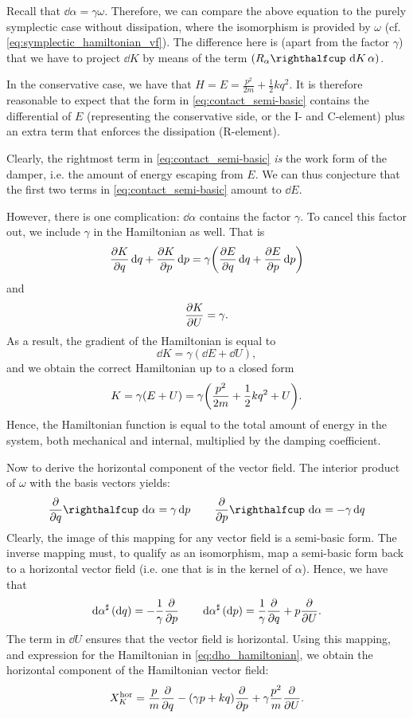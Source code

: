 Recall that $\dd{\alpha} = \gamma \omega $. Therefore, we can compare the above equation to the purely symplectic case without dissipation, where the isomorphism is provided by $\omega$ (cf. \cref{eq:symplectic_hamiltonian_vf}). The difference here is (apart from the factor $\gamma$) that we have to project $\dd{K}$ by means of the term $\qty(\intpr{R_\alpha}{\dd{K}}\alpha)$.

In the conservative case, we have that $H = E = \frac{p^2}{2m} + \frac{1}{2}kq^2$. It is therefore reasonable to expect that the form in \cref{eq:contact_semi-basic} contains the differential of $E$ (representing the conservative side, or the I- and C-element) plus an extra term that enforces the dissipation (R-element). 

Clearly, the rightmost term in \cref{eq:contact_semi-basic} \emph{is} the work form of the damper, i.e. the amount of energy escaping from $E$. We can thus conjecture that the first two terms in \cref{eq:contact_semi-basic} amount to $\dd{E}$.

However, there is one complication: $\dd{\alpha}$ contains the factor $\gamma$. To cancel this factor out, we include $\gamma$ in the Hamiltonian as well. That is
$$ 
    \pdv{K}{q}\dd{q} + \pdv{K}{p}\dd{p} = \gamma \qty(\pdv{E}{q}\dd{q} + \pdv{E}{p}\dd{p}) $$
and 
$$ \pdv{K}{U} = \gamma. $$
As a result, the gradient of the Hamiltonian is equal to 
$$ \dd{K} = \gamma (\dd{E} + \dd{U}), $$
and we obtain the correct Hamiltonian up to a closed form
\begin{equation} 
    K = \gamma (E + U) = \gamma\qty( \frac{p^2}{2m} + \frac{1}{2}kq^2 + U). 
    \label{eq:dho_hamiltonian}
\end{equation} 
Hence, the Hamiltonian function is equal to the total amount of energy in the system, both mechanical and internal, multiplied by the damping coefficient.

Now to derive the horizontal component of the vector field. The interior product of $\omega$ with the basis vectors yields:
\begin{equation}
    \intpr{\pdv{}{q}}{\dd{\alpha}} = \gamma \dd{p} \qquad \intpr{\pdv{}{p}}{\dd{\alpha}} = -\gamma \dd{q}
\end{equation}
Clearly, the image of this mapping for any vector field is a semi-basic form. The inverse mapping must, to qualify as an isomorphism, map a semi-basic form back to a horizontal vector field (i.e. one that is in the kernel of $\alpha$). Hence, we have that
\begin{equation} 
    \dd{\alpha}^\sharp\qty(\dd{q}) = -\frac{1}{\gamma} \pdv{}{p} \qquad 
    \dd{\alpha}^\sharp\qty(\dd{p}) = \frac{1}{\gamma}\pdv{}{q} +  p \pdv{}{U}. 
\end{equation}
The term in $\dd{U}$ ensures that the vector field is horizontal. Using this mapping, and expression for the Hamiltonian in \cref{eq:dho_hamiltonian}, we obtain the horizontal component of the Hamiltonian vector field:
\begin{equation} 
    X_K^\text{hor} = \frac{p}{m}\pdv{}{q} - (\gamma p + kq)\pdv{}{p} + \gamma \frac{p^2}{m} \pdv{}{U}.
    \label{eq:dho_horizontal}
\end{equation}

